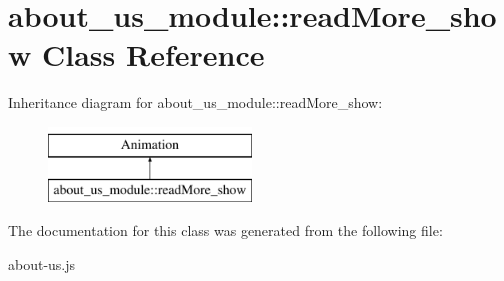 \hypertarget{classabout__us__module_1_1readMore__show}{\section{about\-\_\-us\-\_\-module\-:\-:read\-More\-\_\-show Class Reference}
\label{classabout__us__module_1_1readMore__show}
}
Inheritance diagram for about\-\_\-us\-\_\-module\-:\-:read\-More\-\_\-show\-:\begin{figure}[H]
\begin{center}
\leavevmode
\includegraphics[height=2.000000cm]{classabout__us__module_1_1readMore__show}
\end{center}
\end{figure}


The documentation for this class was generated from the following file\-:\begin{DoxyCompactItemize}
\item 
about-\/us.\-js\end{DoxyCompactItemize}
